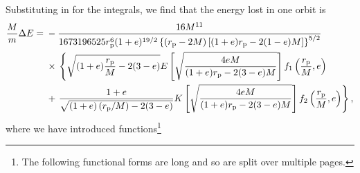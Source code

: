 Substituting in for the integrals, we find that the energy lost in one orbit is
\begin{align}
\dfrac{M}{m} \Delta E = {} & -\dfrac{16 M^{11}}{1673196525 r_\mathrm{p}^{6} (1 + e)^{{19}/{2}} \left\{\left(r_\mathrm{p} - 2 M\right)\left[(1 + e)r_\mathrm{p} - 2(1 - e)M\right]\right\}^{{5}/{2}}} \nonumber \\*
 {} & \times {} \left\{\sqrt{( 1+ e)\dfrac{r_\mathrm{p}}{M} - 2(3 - e)} E\left[\sqrt{\dfrac{4 e M}{(1+e) r_\mathrm{p} - 2(3 - e)M}}\right] f_{1}\left(\dfrac{r_\mathrm{p}}{M}, e\right) \right. \nonumber \\*
   {} & + \left. \dfrac{1 + e}{\sqrt{(1 + e)\left(r_\mathrm{p}/M\right)- 2 (3 - e)}} K\left[\sqrt{\dfrac{4 e M}{(1+e) r_\mathrm{p} - 2(3 - e)M}}\right] f_{2} \left(\dfrac{r_\mathrm{p}}{M}, e\right)\right\},
\end{align}
where we have introduced functions\footnote{The following functional forms are long and so are split over multiple pages.}
